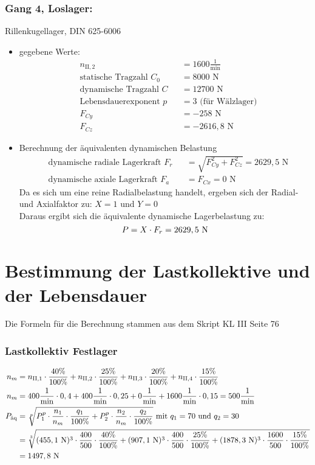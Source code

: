 \subsubsection{Gang 4, Loslager:} Rillenkugellager, DIN 625-6006\\
\begin{itemize}
	\item gegebene Werte:
	\begin{align*}
	&n_{{\mathord{\mathrm{II}},2}} &&=  1600 \frac{1}{\text{min}} \\
	&\text{statische Tragzahl } C_{0} &&= 8000 \text{ N}\\
	&\text{dynamische Tragzahl } C &&= 12700 \text{ N} \\
	&\text{Lebensdauerexponent } p &&= 3 \text{ (für Wälzlager)} \\
	&F_{Cy} && = -258 \text{ N}\\
	&F_{Cz} && = -2616,8 \text{ N}
	\end{align*} 
	\item Berechnung der äquivalenten dynamischen Belastung
	\begin{align*}
	&\text{dynamische radiale Lagerkraft } F_r&& = \sqrt{F_{Cy}^2 + F_{Cz}^2 } =2629,5 \text{ N} \\
	&\text{dynamische axiale Lagerkraft } F_a&& = F_{Cx} = 0\text{ N}
	\end{align*} 
	Da es sich um eine reine Radialbelastung handelt, ergeben sich der Radial- und Axialfaktor zu: $X= 1$ und $Y=0$\\
	Daraus ergibt sich die äquivalente dynamische Lagerbelastung zu:  
	\[
	P= X \cdot F_r =2629,5\text{ N}
	\]
\end{itemize}
\newpage

\section{Bestimmung der Lastkollektive und der Lebensdauer}
Die Formeln für die Berechnung stammen aus dem Skript KL III Seite 76
\subsubsection{Lastkollektiv Festlager}
\begin{align*}
	n_m &= n_{\mathord{\mathrm{II}},1} \cdot \frac{40 \%}{100 \%} + n_{\mathord{\mathrm{II}},2} \cdot \frac{25 \%}{100 \%} + n_{\mathord{\mathrm{II}},3} \cdot \frac{20 \%}{100 \%} + n_{\mathord{\mathrm{II}},4} \cdot \frac{15 \%}{100 \%} \\
	n_m &= 400 \frac{1}{\text{min}} \cdot 0,4 + 400 \frac{1}{\text{min}} \cdot 0,25 + 0 \frac{1}{\text{min}} + 1600 \frac{1}{\text{min}} \cdot 0,15 = 500 \frac{1}{\text{min}} \\
	P_{\text{äq}} &= \sqrt[p]{P_1 ^{p} \cdot \frac{n_1}{n_m} \cdot \frac{q_1}{100\% } + P_2 ^{p} \cdot \frac{n_2}{n_m} \cdot \frac{q_2}{100 \%}} \text{ mit $q_1 = 70$ und $q_2= 30$} \\
	&= \sqrt[3]{(455,1 \text{ N}) ^{3} \cdot \frac{400}{500} \cdot \frac{40 \%}{100 \%} +(907,1 \text{ N} )^{3} \cdot \frac{400}{500} \cdot \frac{25 \%}{100\% } +(1878,3 \text{ N} )^{3} \cdot \frac{1600}{500} \cdot \frac{15 \%}{100\% }} \\
	&= 1497,8 \text{ N}
\end{align*}
